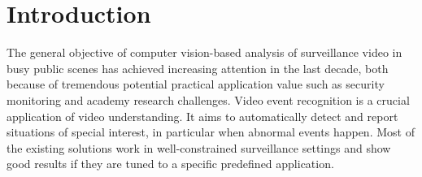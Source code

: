 \chapter{Introduction}
\label{chap:introduction}
\setcounter{page}{1}
The general objective of computer vision-based analysis of surveillance video in busy public scenes has achieved increasing attention in the last decade, both because of tremendous potential practical application value such as security monitoring and academy research challenges.
Video event recognition is a crucial application of video understanding. 
It aims to automatically detect and report situations of special interest, in particular when abnormal events happen.
Most of the existing solutions work in well-constrained surveillance settings and show good results if they are tuned to a specific predefined application. 
